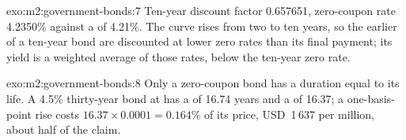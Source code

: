 \begin{solution}{exo:m2:government-bonds:7}
Ten-year discount factor 0.657651, zero-coupon rate 4.2350\% against a  of 4.21\%. The  curve rises from two to ten years, so the earlier
 of a ten-year  bond are discounted at lower zero rates than its
final payment; its yield is a weighted average of those rates, below the
ten-year zero rate.
\end{solution}

\begin{solution}{exo:m2:government-bonds:8}
Only a zero-coupon bond has a duration equal to its life. A 4.5\% thirty-year
bond at  has a  of 16.74 years and a  of
16.37; a one-basis-point rise costs $16.37 \times 0.0001 = 0.164\%$ of its price,
USD~1\,637 per million, about half of the claim.
\end{solution}

